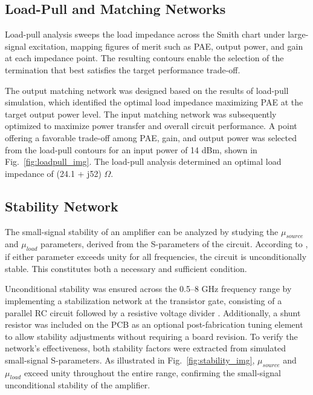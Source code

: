 \subsection{Load-Pull and Matching Networks}
Load-pull analysis sweeps the load impedance across the Smith chart under large-signal excitation, mapping figures of merit such as PAE, output power, and gain at each impedance point. The resulting contours enable the selection of the termination that best satisfies the target performance trade-off.

The output matching network was designed based on the results of load-pull simulation, which identified the optimal load impedance maximizing PAE at the target output power level. The input matching network was subsequently optimized to maximize power transfer and overall circuit performance. A point offering a favorable trade-off among PAE, gain, and output power was selected from the load-pull contours for an input power of 14 dBm, shown in Fig.~\ref{fig:loadpull_img}. The load-pull analysis determined an optimal load impedance of (24.1 + j52) $\Omega$.

\subsection{Stability Network}
The small-signal stability of an amplifier can be analyzed by studying the $\mu_{source}$ and $\mu_{load}$ parameters, derived from the S-parameters of the circuit. According to \cite{Edwards1992}, if either parameter exceeds unity for all frequencies, the circuit is unconditionally stable. This constitutes both a necessary and sufficient condition.

Unconditional stability was ensured across the 0.5–8 GHz frequency range by implementing a stabilization network at the transistor gate, consisting of a parallel RC circuit followed by a resistive voltage divider \cite{Bahl2009}. Additionally, a shunt resistor was included on the PCB as an optional post-fabrication tuning element to allow stability adjustments without requiring a board revision. To verify the network's effectiveness, both stability factors were extracted from simulated small-signal S-parameters. As illustrated in Fig.~\ref{fig:stability_img}, $\mu_{source}$ and $\mu_{load}$ exceed unity throughout the entire range, confirming the small-signal unconditional stability of the amplifier.

